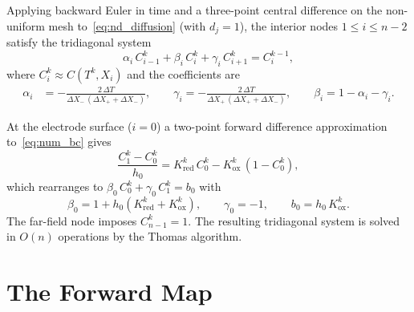 Applying backward Euler in time and a three-point central difference on
the non-uniform mesh to~\cref{eq:nd_diffusion} (with $d_j = 1$), the
interior nodes $1 \leq i \leq n-2$ satisfy the tridiagonal system
\begin{equation}
  \alpha_i\, C_{i-1}^k + \beta_i\, C_i^k + \gamma_i\, C_{i+1}^k
  = C_i^{k-1},
  \label{eq:tridiag_interior}
\end{equation}
where $C_i^k \approx C(T^k, X_i)$ and the coefficients are
\begin{equation}
  \begin{aligned}
    \alpha_i &= -\frac{2\,\Delta T}
    {\Delta X_-\,(\Delta X_+ + \Delta X_-)}, \qquad
    \gamma_i = -\frac{2\,\Delta T}
    {\Delta X_+\,(\Delta X_+ + \Delta X_-)}, \qquad
    \beta_i  = 1 - \alpha_i - \gamma_i.
  \end{aligned}
  \label{eq:interior_coeffs}
\end{equation}

At the electrode surface ($i = 0$) a two-point forward difference
approximation to~\cref{eq:num_bc} gives
\begin{equation}
  \frac{C_1^k - C_0^k}{h_0}
  = K_{\mathrm{red}}^k\, C_0^k
  - K_{\mathrm{ox}}^k\,(1 - C_0^k),
  \label{eq:fd_electrode_raw}
\end{equation}
which rearranges to $\beta_0\, C_0^k + \gamma_0\, C_1^k = b_0$ with
\begin{equation}
  \beta_0  = 1 + h_0(K_{\mathrm{red}}^k + K_{\mathrm{ox}}^k), \qquad
  \gamma_0 = -1, \qquad
  b_0      = h_0\, K_{\mathrm{ox}}^k.
  \label{eq:electrode_coeffs}
\end{equation}
The far-field node imposes $C_{n-1}^k = 1$. The resulting
tridiagonal system is solved in $O(n)$ operations by the Thomas algorithm.

\section{The Forward Map}\label{sec:forward-map}

